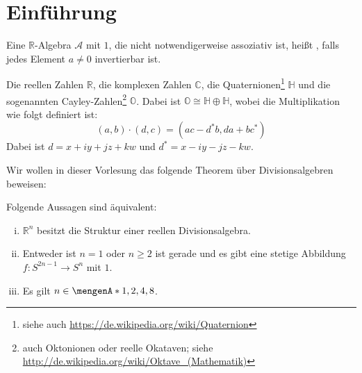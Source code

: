 
\newcommand{\fach}{$K$-Theorie und die Hopf-Invariante}
\newcommand{\semester}{SoSe 2015}
\newcommand{\homepage}{https://wwwmath.uni-muenster.de/reine/u/topos/lehre/SS2015/KTheorie-Hopf/Hopf.html}

\newcommand{\prof}{Dr.\ Ulrich Penning}
\publishers{\scalebox{14}{$K$}}



\maketitle
\begin{abstract}

\end{abstract}

\tableofcontents
\cleardoubleoddemptypage

\setcounter{page}{1}

\section*{Einführung} %
\label{sec:0}

\begin{definition*}[{name=[Definition: Reelle Divisionsalgebra]},label=sub:01,numbered=no]
Eine $\mathds{R}$-Algebra $\mathcal{A}$ mit $1$, die nicht notwendigerweise assoziativ ist, heißt , falls jedes Element $a\not= 0$ invertierbar 
ist.	
\end{definition*}

\begin{beispiel}
Die reellen Zahlen $\mathds{R}$, die komplexen Zahlen $\mathds{C}$, die Quaternionen\footnote{siehe auch \url{https://de.wikipedia.org/wiki/Quaternion}} $\mathds{H}$ und die sogenannten Cayley-Zahlen\footnote{auch Oktonionen oder reelle Okataven; siehe  \url{http://de.wikipedia.org/wiki/Oktave_(Mathematik)}} $\mathds{O}$. Dabei ist
$\mathds{O} \cong \mathds{H} \oplus \mathds{H}$, wobei die Multiplikation wie folgt definiert ist:
\[
	(a,b) \cdot (d,c) = (ac - d^* b, da + bc^*) 
\]
Dabei ist $d= x + iy + jz + kw$ und $d^* = x -iy -jz - kw$.
\end{beispiel}

\noindent Wir wollen in dieser Vorlesung das folgende Theorem über Divisionsalgebren beweisen:
\begin{theorem*}[name={Adams},restate=Adams]
Folgende Aussagen sind äquivalent:
\begin{enumerate}[(i)]
	\item $\mathds{R}^n$ besitzt die Struktur einer reellen Divisionsalgebra.
	\item Entweder ist $n=1$ oder $n \ge 2$ ist gerade und es gibt eine stetige Abbildung $f \colon S^{2n-1} \to S^n$ mit  $1$.
	\item Es gilt $n \in \set{1,2,4,8}$.
\end{enumerate}
\end{theorem*}


